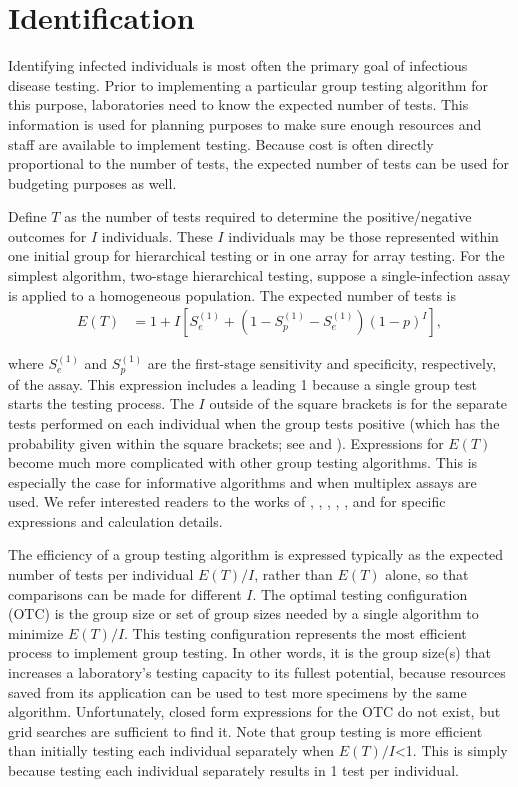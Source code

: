 \section[Identification]{Identification\label{sec:Identification}}

Identifying infected individuals is most often the primary goal of
infectious disease testing. Prior to implementing a particular group
testing algorithm for this purpose, laboratories need to know the
expected number of tests. This information is used for planning purposes
to make sure enough resources and staff are available to implement
testing. Because cost is often directly proportional to the number
of tests, the expected number of tests can be used for budgeting purposes
as well.

Define $T$ as the number of tests required to determine the positive/negative
outcomes for $I$ individuals. These $I$ individuals may be those
represented within one initial group for hierarchical testing or in
one array for array testing. For the simplest algorithm, two-stage
hierarchical testing, suppose a single-infection assay is applied
to a homogeneous population. The expected number of tests is
\begin{align*}
E(T) & =1+I\left[S_{e}^{(1)}+(1-S_{p}^{(1)}-S_{e}^{(1)})(1-p)^{I}\right],
\end{align*}

\noindent where $S_{e}^{(1)}$ and $S_{p}^{(1)}$ are the first-stage
sensitivity and specificity, respectively, of the assay. This expression
includes a leading 1 because a single group test starts the testing
process. The $I$ outside of the square brackets is for the separate
tests performed on each individual when the group tests positive (which
has the probability given within the square brackets; see \citet{Kim2007}
and \citet{bilder2019id}). Expressions for $E(T)$ become much more
complicated with other group testing algorithms. This is especially
the case for informative algorithms and when multiplex assays are
used. We refer interested readers to the works of \citet{Kim2007},
\citet{mcmahan2012informative}, \citet{mcmahan2012informative},
\citet{black2015optimal}, \citet{bilder2019informative}, and \citet{houarray1}
for specific expressions and calculation details.

The efficiency of a group testing algorithm is expressed typically
as the expected number of tests per individual $E(T)/I$, rather than
$E(T)$ alone, so that comparisons can be made for different $I$.
 The optimal testing configuration (OTC) is the group size or set
of group sizes needed by a single algorithm to minimize $E(T)/I$.
This testing configuration represents the most efficient process to
implement group testing. In other words, it is the group size(s) that
increases a laboratory's testing capacity to its fullest potential,
because resources saved from its application can be used to test more
specimens by the same algorithm. Unfortunately, closed form expressions
for the OTC do not exist, but grid searches are sufficient to find
it. Note that group testing is more efficient than initially testing
each individual separately when $E(T)/I$<1. This is simply because
testing each individual separately results in 1 test per individual. 

